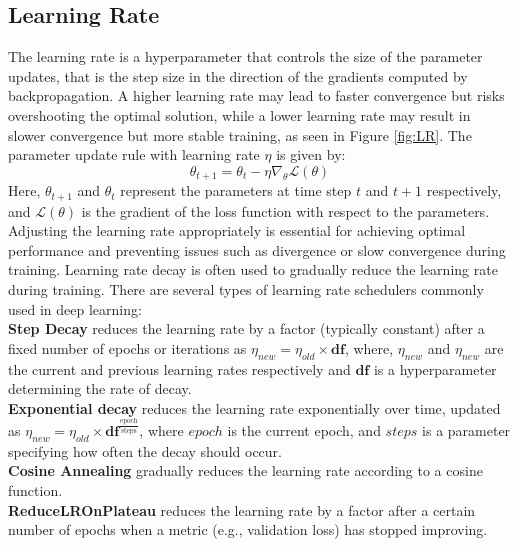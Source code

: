 \subsection{Learning Rate}
The learning rate is a hyperparameter that controls the size of the parameter updates, that is the step size in the direction of the gradients computed by backpropagation. A higher learning rate may lead to faster convergence but risks overshooting the optimal solution, while a lower learning rate may result in slower convergence but more stable training, as seen in Figure \ref{fig:LR}. The parameter update rule with learning rate $\eta$ is given by:
\begin{equation}
    \theta_{t+1}=\theta_t-\eta \nabla_\theta \mathcal{L}(\theta)
    \end{equation}
Here, $\theta_{t+1}$ and $\theta_t$ represent the parameters at time step $t$ and $t+1$ respectively, and $\mathcal{L}(\theta)$ is the gradient of the loss function with respect to the parameters. Adjusting the learning rate appropriately is essential for achieving optimal performance and preventing issues such as divergence or slow convergence during training. Learning rate decay is often used to gradually reduce the learning rate during training. There are several types of learning rate schedulers commonly used in deep learning: \\
\textbf{Step Decay} reduces the learning rate by a factor (typically constant) after a fixed number of epochs or iterations as $\eta_{new} = \eta_{old} \times \mathbf{df}$, where, $\eta_{new}$ and $\eta_{new}$ are the current and previous learning rates respectively and $\mathbf{df}$ is a hyperparameter determining the rate of decay. \\
\textbf{Exponential decay} reduces the learning rate exponentially over time, updated as $\eta_{new} = \eta_{old} \times \mathbf{df}^{\frac{\text{epoch}}{\text{steps}}}$, where $epoch$ is the current epoch, and $steps$ is a parameter specifying how often the decay should occur. \\
\textbf{Cosine Annealing} gradually reduces the learning rate according to a cosine function. \\
\textbf{ReduceLROnPlateau} reduces the learning rate by a factor after a certain number of epochs when a metric (e.g., validation loss) has stopped improving.
